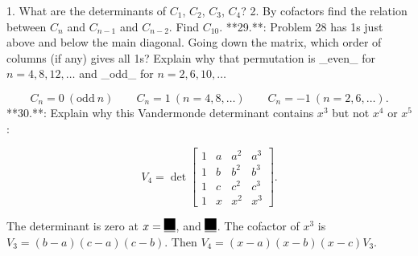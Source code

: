 1. What are the determinants of \(C_{1}\), \(C_{2}\), \(C_{3}\), \(C_{4}\)?
2. By cofactors find the relation between \(C_{n}\) and \(C_{n-1}\) and \(C_{n-2}\). Find \(C_{10}\).
**29.**: Problem 28 has 1s just above and below the main diagonal. Going down the matrix, which order of columns (if any) gives all 1s? Explain why that permutation is _even_ for \(n=4,8,12,\ldots\) and _odd_ for \(n=2,6,10,\ldots\)

\[C_{n}=0\ (\text{odd}\ n)\qquad C_{n}=1\ (n=4,8,\ldots)\qquad C_{n}=-1\ (n=2,6,\ldots).\]
**30.**: Explain why this Vandermonde determinant contains \(x^{3}\) but not \(x^{4}\) or \(x^{5}\):

\[V_{4}=\det\begin{bmatrix}1&a&a^{2}&a^{3}\\ 1&b&b^{2}&b^{3}\\ 1&c&c^{2}&c^{3}\\ 1&x&x^{2}&x^{3}\end{bmatrix}.\]

The determinant is zero at \(x=\underline{\phantom{\rule{0.0pt}{10.0pt}}\rule{10.0pt}{10.0pt}}\), and \(\underline{\phantom{\rule{0.0pt}{10.0pt}}\rule{10.0pt}{10.0pt}}\). The cofactor of \(x^{3}\) is \(V_{3}=(b-a)(c-a)(c-b)\). Then \(V_{4}=(x-a)(x-b)(x-c)V_{3}\).

